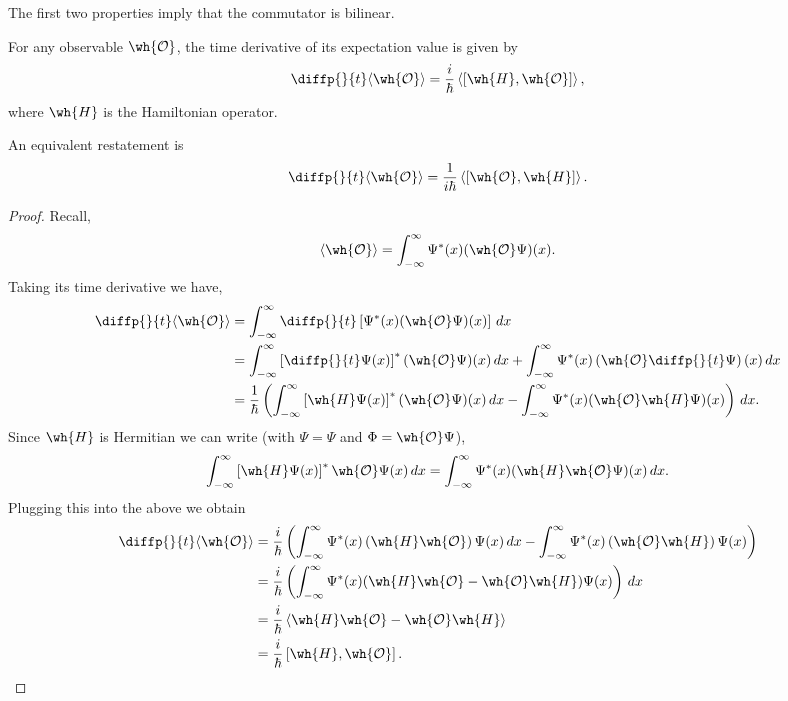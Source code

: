 \documentclass[12pt, a4paper]{article}
\begin{document}
\begin{mdnote}
    The first two properties imply that the commutator is bilinear.
\end{mdnote}

\begin{mdthm}
    For any observable \(\wh{\mathcal{O}}\), the time derivative of its expectation value is given by 
    \[\diffp{}{t} \langle \wh{\mathcal{O}} \rangle = \frac{i}{\hbar} \left\langle \left[ \wh{H}, \wh{\mathcal{O}} \right] \right\rangle,\]
    where \(\wh{H}\) is the Hamiltonian operator.
\end{mdthm}

\begin{mdremark}
    An equivalent restatement is 
    \[\diffp{}{t} \langle \wh{\mathcal{O}} \rangle = \frac{1}{i \hbar} \left\langle \left[\wh{\mathcal{O}} ,\wh{H} \right] \right\rangle.\]
\end{mdremark}

\begin{proof}
    Recall, 
    \[\langle \wh{\mathcal{O}} \rangle = \int_{-\infty}^{\infty} \Psi^*(x) (\wh{\mathcal{O}}\Psi)(x).\]
    Taking its time derivative we have,
    \[\begin{aligned}
        \diffp{}{t} \langle \wh{\mathcal{O}} \rangle &= \int_{-\infty}^{\infty} \diffp{}{t} \left[ \Psi^*(x) (\wh{\mathcal{O}}\Psi)(x) \right] \, dx \\
        &= \int_{-\infty}^{\infty} \left[ \diffp{}{t} \Psi(x) \right]^* (\wh{\mathcal{O}} \Psi)(x) \, dx + \int_{-\infty}^{\infty} \Psi^*(x) \left( \wh{\mathcal{O}} \diffp{}{t}\Psi \right)(x) \, dx \\
        &= \frac{1}{\hbar} \left( \int_{-\infty}^{\infty} \left[ \wh{H} \Psi(x) \right]^* (\wh{\mathcal{O}} \Psi)(x)\, dx - \int_{-\infty}^{\infty} \Psi^*(x) (\wh{\mathcal{O}}\wh{H} \Psi)(x)\right) \, dx.
    \end{aligned}\]
    Since \(\wh{H}\) is Hermitian we can write (with \(\Psi = \Psi\) and \(\Phi=\wh{\mathcal{O}}\Psi\)),
    \[\int_{-\infty}^{\infty} \left[ \wh{H}\Psi(x) \right]^* \wh{\mathcal{O}} \Psi(x) \, dx = \int_{-\infty}^{\infty} \Psi^*(x) (\wh{H}\wh{\mathcal{O}}\Psi)(x) \, dx.\]
    Plugging this into the above we obtain 
    \[\begin{aligned}
        \diffp{}{t} \langle \wh{\mathcal{O}} \rangle &= \frac{i}{\hbar} \left( \int_{-\infty}^{\infty} \Psi^*(x) \left(\wh{H}\wh{\mathcal{O}} \right) \Psi(x) \, dx - \int_{-\infty}^{\infty} \Psi^*(x) \left(\wh{\mathcal{O}}\wh{H}\right)\Psi(x) \right) \\
        &= \frac{i}{\hbar} \left( \int_{-\infty}^{\infty} \Psi^*(x)(\wh{H}\wh{\mathcal{O}}-\wh{\mathcal{O}}\wh{H})\Psi(x) \right) \, dx \\
        &= \frac{i}{\hbar} \left\langle \wh{H}\wh{\mathcal{O}}-\wh{\mathcal{O}}\wh{H} \right\rangle  \\
        &= \frac{i}{\hbar} \left[ \wh{H},\wh{\mathcal{O}} \right].
    \end{aligned}\]
\end{proof}
\end{document}
